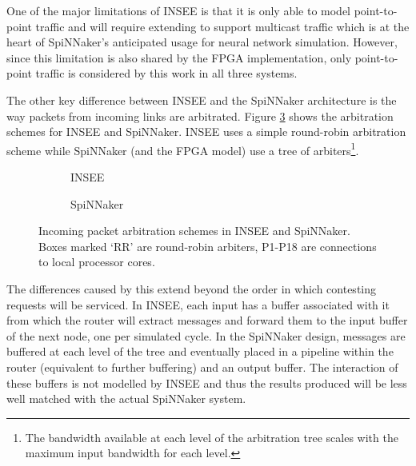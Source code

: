 			One of the major limitations of INSEE is that it is only able to model
			point-to-point traffic and will require extending to support multicast
			traffic which is at the heart of SpiNNaker's anticipated usage for neural
			network simulation. However, since this limitation is also shared by the
			FPGA implementation, only point-to-point traffic is considered by this
			work in all three systems.
			
			The other key difference between INSEE and the SpiNNaker architecture is
			the way packets from incoming links are arbitrated. Figure
			\ref{fig:arbitration} shows the arbitration schemes for INSEE and
			SpiNNaker. INSEE uses a simple round-robin arbitration scheme while
			SpiNNaker (and the FPGA model) use a tree of arbiters\footnote{The
			bandwidth available at each level of the arbitration tree scales with the
			maximum input bandwidth for each level.}.
			
			\begin{figure}
				\begin{subfigure}[t]{0.50\textwidth}
					\center
					
					
					\caption{INSEE}
					\label{fig:arbitrationINSEE}
				\end{subfigure}
				\begin{subfigure}[t]{0.50\textwidth}
					\center
					
					
					\caption{SpiNNaker}
					\label{fig:arbitrationSpiNNaker}
				\end{subfigure}
				
				\caption[Incoming packet arbitration schemes in INSEE and
				SpiNNaker.]{Incoming packet arbitration schemes in INSEE and SpiNNaker.
				Boxes marked `RR' are round-robin arbiters, P1-P18 are connections to
				local processor cores.}
				\label{fig:arbitration}
			\end{figure}
			
			The differences caused by this extend beyond the order in which contesting
			requests will be serviced. In INSEE, each input has a buffer associated
			with it from which the router will extract messages and forward them to
			the input buffer of the next node, one per simulated cycle. In the
			SpiNNaker design, messages are buffered at each level of the tree and
			eventually placed in a pipeline within the router (equivalent to further
			buffering) and an output buffer. The interaction of these buffers is not
			modelled by INSEE and thus the results produced will be less well matched
			with the actual SpiNNaker system.
			
